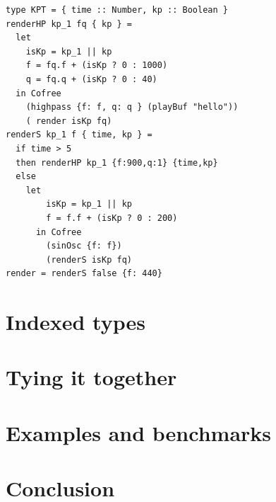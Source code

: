 \documentclass{article}
\begin{document}
\lstset{language=Haskell, style=psstyle}
\begin{lstlisting}
type KPT = { time :: Number, kp :: Boolean }
renderHP kp_1 fq { kp } =
  let
    isKp = kp_1 || kp
    f = fq.f + (isKp ? 0 : 1000)
    q = fq.q + (isKp ? 0 : 40)
  in Cofree
    (highpass {f: f, q: q } (playBuf "hello"))
    ( render isKp fq)
renderS kp_1 f { time, kp } =
  if time > 5
  then renderHP kp_1 {f:900,q:1} {time,kp}
  else
    let
        isKp = kp_1 || kp
        f = f.f + (isKp ? 0 : 200)
      in Cofree
        (sinOsc {f: f})
        (renderS isKp fq)
render = renderS false {f: 440}
\end{lstlisting}

\section{Indexed types}
\label{sec:indexed_types}

\section{Tying it together}
\label{sec:tying_it_together}

\section{Examples and benchmarks}
\label{sec:examples_and_benchmarks}

\section{Conclusion}
\label{sec:conclusion}



\end{document}

